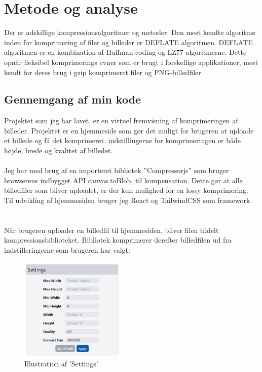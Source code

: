 \documentclass[12pt]{article}
\begin{document}
\section{Metode og analyse}
Der er adskillige kompressionsalgoritmer og metoder. Den mest kendte algoritme inden for komprimering af filer og billeder er DEFLATE algoritmen. 
DEFLATE algoritmen er en kombination af Huffman coding og LZ77 algoritmerne. Dette opnår fleksibel komprimerings evner som er brugt i forskellige applikationer, 
mest kendt for deres brug i gzip komprimeret filer og PNG-billedfiler.
\subsection{Gennemgang af min kode}
Projektet som jeg har lavet, er en virtuel fremvisning af komprimeringen af billeder. Projektet er en hjemmeside som gør det muligt for brugeren at uploade et billede og få det komprimeret. 
indstillingerne for komprimeringen er både højde, brede og kvalitet af billedet. \\\\
Jeg har med brug af en importeret bibliotek ”Compressorjs”\cite{Compressorjs} som bruger browserens indbygget API canvas.toBlob, til kompensation. 
Dette gør at alle billedfiler som bliver uploadet, er der kun mulighed for en lossy komprimering. Til udvikling af hjemmesiden bruger jeg React og TailwindCSS som framework. \\\\\\
Når brugeren uploader en billedfil til hjemmesiden, bliver filen tildelt kompressionsbiblioteket. Bibliotek komprimerer derefter billedfilen ud fra indstilleringerne som brugeren har valgt:\\
\noindent\begin{minipage}{.4\textwidth}
  \begin{figure}[H]
    \centering
    \includegraphics[width=5cm]{2.png}%
    \caption{\centering Illustration af 'Settings'}%
  \end{figure}
  \end{minipage}\hfill
\end{document}
